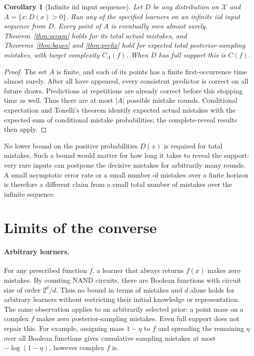 \documentclass[11pt]{article}
\newtheorem{corollary}[theorem]{Corollary}
\newcommand{\cX}{\mathcal X}
\newcommand{\1}{\mathbf 1}
\begin{document}
\begin{corollary}[Infinite iid input sequence]\label{cor:iid}
Let $D$ be any distribution on $\cX$ and
$A=\{x:D(x)>0\}$. Run any of the specified learners on an infinite iid
input sequence from $D$. Every point of $A$ is eventually seen almost
surely. Theorem~\ref{thm:occam} holds for its total actual mistakes, and
Theorems~\ref{thm:bayes} and \ref{thm:prefix} hold for expected total
posterior-sampling mistakes, with target complexity $C_A(f)$.
When $D$ has full support this is $C(f)$.
\end{corollary}
\begin{proof}
The set $A$ is finite, and each of its points has a finite first-occurrence
time almost surely. After all have appeared, every consistent predictor
is correct on all future draws. Predictions at repetitions are already
correct before this stopping time as well. Thus there are at most $|A|$
possible mistake rounds. Conditional expectation and Tonelli's theorem
identify expected actual mistakes with the expected sum of conditional
mistake probabilities; the complete-reveal results then apply.
\end{proof}

No lower bound on the positive probabilities $D(x)$ is required for
total mistakes. Such a bound would matter for how long it takes to
reveal the support: very rare inputs can postpone the decisive mistakes
for arbitrarily many rounds. A small asymptotic error rate or a small
number of mistakes over a finite horizon is therefore a different claim
from a small total number of mistakes over the infinite sequence.

\section{Limits of the converse}

\paragraph{Arbitrary learners.}
For any prescribed function $f$, a learner that always returns $f(x)$
makes zero mistakes. By counting NAND circuits, there are Boolean
functions with circuit size of order $2^d/d$. Thus no bound in terms of
mistakes and $d$ alone holds for arbitrary learners without restricting
their initial knowledge or representation. The same observation applies
to an arbitrarily selected prior: a point mass on a complex $f$ makes
zero posterior-sampling mistakes. Even full support does not repair this.
For example, assigning mass $1-\eta$ to $f$ and spreading the remaining
$\eta$ over all Boolean functions gives cumulative sampling mistakes at
most $-\log(1-\eta)$, however complex $f$ is.
\end{document}
